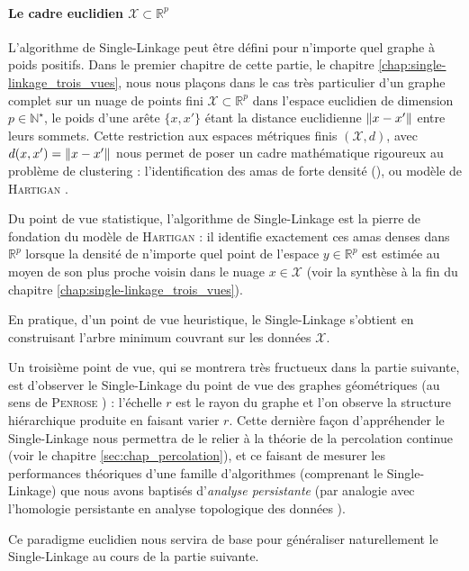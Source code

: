 \documentclass{these-ISSS} %
\begin{document}
\paragraph{Le cadre euclidien $\mathcal X \subset \mathbb R^p$}
L'algorithme de Single-Linkage \cite{DendriteSingleLinkage1951, GowerRoss1969} peut être défini pour n'importe quel graphe à poids positifs. Dans le premier chapitre de cette partie, le chapitre \ref{chap:single-linkage_trois_vues}, nous nous plaçons dans le cas très particulier d'un graphe complet sur un nuage de points fini $\mathcal X \subset \mathbb R^p$ dans l'espace euclidien de dimension $p\in \mathbb N^\star$, le poids d'une arête $\bigl\{x,x'\bigr\}$ étant la distance euclidienne $\lVert x-x' \rVert $ entre leurs sommets. 
Cette restriction aux espaces métriques finis $(\mathcal X, d)$, avec $d(x,x') = \lVert x-x' \rVert$ nous permet de poser un cadre mathématique rigoureux au problème de clustering : l'identification des amas de forte densité (), ou modèle de \textsc{Hartigan} \cite{hartigan81, penrose2003}. 

Du point de vue statistique, l'algorithme de Single-Linkage est la pierre de fondation du modèle de \textsc{Hartigan} : il identifie exactement ces amas denses dans $\mathbb R^p$ lorsque la densité de n'importe quel point de l'espace $y \in \mathbb R^p$ est estimée au moyen de son plus proche voisin dans le nuage $x\in \mathcal X$ (voir la synthèse à la fin du chapitre \ref{chap:single-linkage_trois_vues}).

En pratique, d'un point de vue heuristique, le Single-Linkage s'obtient en construisant l'arbre minimum couvrant sur les données $\mathcal X$.

Un troisième point de vue, qui se montrera très fructueux dans la partie suivante, est d'observer le Single-Linkage du point de vue des graphes géométriques (au sens de \textsc{Penrose} \cite{penrose2003}) : l'échelle $r$ est le rayon du graphe et l'on observe la structure hiérarchique produite en faisant varier $r$.
Cette dernière façon d'appréhender le Single-Linkage nous permettra de le relier à la théorie de la percolation continue \cite{MeesterRoy, penrose2003} (voir le chapitre \ref{sec:chap_percolation}), et ce faisant de mesurer les performances théoriques d'une famille d'algorithmes (comprenant le Single-Linkage) que nous avons baptisés d'\emph{analyse persistante} (par analogie avec l'homologie persistante en analyse topologique des données \cite{BobrowskiKahle}).

Ce paradigme euclidien nous servira de base pour généraliser naturellement le Single-Linkage au cours de la partie suivante.
\end{document}
